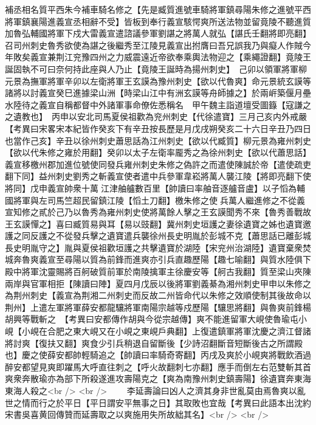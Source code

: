 補丞相名質平西朱今補車騎名修之【先是臧質進號車騎將軍鎮尋陽朱修之進號平西將軍鎮襄陽進義宣丞相辭不受】皆板到奉行義宣駭愕爽所送法物並留竟陵不聽進質加魯弘輔國將軍下戍大雷義宣遣諮議參軍劉諶之將萬人就弘【諶氏壬翻將即亮翻】召司州刺史魯秀欲使為諶之後繼秀至江陵見義宣出拊膺曰吾兄誤我乃與癡人作賊今年敗矣義宣兼荆江兖豫四州之力威震遠近帝欲奉乘輿法物迎之【乘繩證翻】竟陵王誕固執不可曰奈何持此座與人乃止【竟陵王誕時為揚州刺史】　己卯以領軍將軍柳元景為撫軍將軍辛卯以左衛將軍王玄謨為豫州刺史【欲以代魯爽】命元景統玄謨等諸將以討義宣癸巳進據梁山洲【時梁山江中有洲玄謨等舟師據之】於兩㟁築偃月壘水陸待之義宣自稱都督中外諸軍事命僚佐悉稱名　甲午魏主詣道壇受圖籙【寇謙之之遺教也】　丙申以安北司馬夏侯祖歡為兖州刺史【代徐遣寶】三月己亥内外戒嚴　【考異曰宋畧宋本紀皆作癸亥下有辛丑按長歷是月戊戌朔癸亥二十六日辛丑乃四日也當作己亥】辛丑以徐州刺史蕭思話為江州刺史【欲以代臧質】柳元景為雍州刺史【欲以代朱修之雍於用翻】癸卯以太子左衛率龎秀之為徐州刺史【欲以代蕭思話】義宣移檄州郡加進位號使同發兵雍州刺史朱修之偽許之而遣使陳誠於帝【遣使疏吏翻下同】益州刺史劉秀之斬義宣使者遣中兵參軍韋崧將萬人襲江陵【將即亮翻下使將同】戊申義宣帥衆十萬江津舳艫數百里【帥讀曰率舳音逐艫音盧】以子慆為輔國將軍與左司馬竺超民留鎮江陵【慆土刀翻】檄朱修之使兵萬人繼進修之不從義宣知修之貳於己乃以魯秀為雍州刺史使將萬餘人擊之王玄謨聞秀不來【魯秀善戰故王玄謨憚之】喜曰臧質易與耳【易以豉翻】冀州刺史垣護之妻徐遺寶之姊也遺寶邀護之同反護之不從發兵擊之遺寶遣兵襲徐州長史明胤於彭城不克【蕭思話已離彭城長史明胤守之】胤與夏侯祖歡垣護之共擊遺寶於湖陸【宋兖州治湖陸】遺寶棄衆焚城奔魯爽義宣至尋陽以質為前鋒而進爽亦引兵直趣歷陽【趣七喻翻】與質水陸俱下殿中將軍沈靈賜將百舸破質前軍於南陵擒軍主徐慶安等【舸古我翻】質至梁山夾陳兩岸與官軍相拒【陳讀曰陣】夏四月戊辰以後將軍劉義綦為湘州刺史甲申以朱修之為荆州刺史【義宣為荆湘二州刺史而反故二州皆命代以朱修之效順使制其後故命以荆州】上遣左軍將軍薛安都龍驤將軍南陽宗越等戍歷陽【驤思將翻】與魯爽前鋒楊胡興等戰斬之　【考異曰安都傳作胡與今從宗越傳】爽不能進留軍大峴使魯瑜屯小峴【小峴在合肥之東大峴又在小峴之東峴戶典翻】上復遣鎮軍將軍沈慶之濟江督諸將討爽【復扶又翻】爽食少引兵稍退自留斷後【少詩沼翻斷音短斷後古之所謂殿也】慶之使薛安都帥輕騎追之【帥讀曰率騎奇寄翻】丙戌及爽於小峴爽將戰飲酒過醉安都望見爽即躍馬大呼直往刺之【呼火故翻刺七亦翻】應手而倒左右范雙斬其首爽衆奔散瑜亦為部下所殺遂進攻壽陽克之【爽為南豫州刺史鎮壽陽】徐遺寶奔東海東海人殺之<br />
<br />
　　李延壽論曰凶人之濟其身非世亂莫由焉魯爽以亂世之情而行之於平日【平日謂安平無事之日】其取敗也宜哉【考異曰此語本出沈約宋書吳喜黄回傳贊而延壽取之以爽施用失所故絀其名】<br />
<br />
